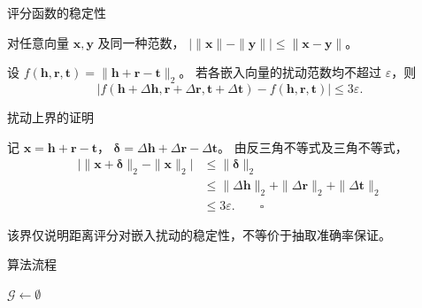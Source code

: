 \documentclass[aspectratio=169, UTF8]{ctexbeamer}
\begin{document}
\begin{frame}{评分函数的稳定性}
  \begin{nklemma}[title={引理：反三角不等式}]
    对任意向量 $\bm{x},\bm{y}$ 及同一种范数，
    $\bigl|\|\bm{x}\|-\|\bm{y}\|\bigr|\leq\|\bm{x}-\bm{y}\|$。
  \end{nklemma}
  \begin{nktheorem}[title={定理：TransE 距离评分的扰动上界}]
    设 $f(\bm{h},\bm{r},\bm{t})=\|\bm{h}+\bm{r}-\bm{t}\|_2$。
    若各嵌入向量的扰动范数均不超过 $\varepsilon$，则
    \[
      |f(\bm{h}+\Delta\bm{h},\bm{r}+\Delta\bm{r},\bm{t}+\Delta\bm{t})
       -f(\bm{h},\bm{r},\bm{t})|\leq 3\varepsilon.
    \]
  \end{nktheorem}
\end{frame}

\begin{frame}{扰动上界的证明}
  \begin{nkproof}[title={证明：两次应用范数不等式}]
    记 $\bm{x}=\bm{h}+\bm{r}-\bm{t}$，
    $\bm{\delta}=\Delta\bm{h}+\Delta\bm{r}-\Delta\bm{t}$。
    由反三角不等式及三角不等式，
    \begin{align*}
      \bigl|\|\bm{x}+\bm{\delta}\|_2-\|\bm{x}\|_2\bigr|
      &\leq\|\bm{\delta}\|_2\\
      &\leq\|\Delta\bm{h}\|_2+\|\Delta\bm{r}\|_2+\|\Delta\bm{t}\|_2\\
      &\leq 3\varepsilon.\qquad\square
    \end{align*}
  \end{nkproof}
  \begin{nkremark}[title={}]
    该界仅说明距离评分对嵌入扰动的稳定性，不等价于抽取准确率保证。
  \end{nkremark}
\end{frame}

\begin{frame}{算法流程}
  \vspace{-0.5em}
  \begin{algorithm}[H]
    \small
    \caption{RAG-based Knowledge Extraction}
    \SetAlgoLined
    $\mathcal{G} \gets \emptyset$\;
    \;
  \end{algorithm}
\end{frame}
\end{document}
